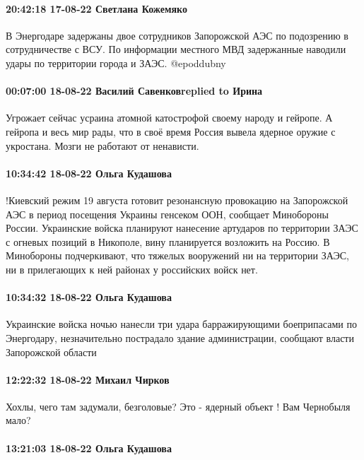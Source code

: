 \paragraph{20:42:18 17-08-22 Светлана Кожемяко}

В Энергодаре задержаны двое сотрудников Запорожской АЭС по подозрению в сотрудничестве с ВСУ.
По информации местного МВД задержанные наводили удары по территории города и ЗАЭС.
@epoddubny

\paragraph{00:07:00 18-08-22 Василий Савенковreplied to Ирина}

Угрожает сейчас усраина атомной катострофой своему народу и гейропе. А гейропа
и весь мир рады, что в своё время Россия вывела ядерное оружие с укростана.
Мозги не работают от ненависти.

\paragraph{10:34:42 18-08-22 Ольга Кудашова}

!Киевский режим 19 августа готовит резонансную провокацию на Запорожской АЭС в период посещения Украины генсеком ООН, сообщает Минобороны России.
Украинские войска планируют нанесение артударов по территории ЗАЭС с огневых позиций в Никополе, вину планируется возложить на Россию.
В Минобороны подчеркивают, что тяжелых вооружений ни на территории ЗАЭС, ни в прилегающих к ней районах у российских войск нет.

\paragraph{10:34:32 18-08-22 Ольга Кудашова}

Украинские войска ночью нанесли три удара барражирующими боеприпасами по
Энергодару, незначительно пострадало здание администрации, сообщают власти
Запорожской области

\paragraph{12:22:32 18-08-22 Михаил Чирков}

Хохлы, чего там задумали, безголовые?
Это - ядерный объект !
Вам Чернобыля мало?

\paragraph{13:21:03 18-08-22 Ольга Кудашова}


